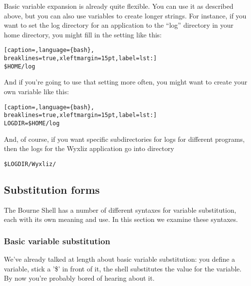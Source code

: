 Basic variable expansion is already quite flexible. You can use it as described
above, but you can also use variables to create longer strings. For instance,
if you want to set the log directory for an application to the ``log''
directory in your home directory, you might fill in the setting like this:
\lstset{basicstyle=\scriptsize, numbers=left, captionpos=b, tabsize=4}
\begin{lstlisting}[caption=,language={bash},
breaklines=true,xleftmargin=15pt,label=lst:]
$HOME/log
\end{lstlisting}

And if you're going to use that setting more often, you might want to create
your own variable like this:
\lstset{basicstyle=\scriptsize, numbers=left, captionpos=b, tabsize=4}
\begin{lstlisting}[caption=,language={bash},
breaklines=true,xleftmargin=15pt,label=lst:]
LOGDIR=$HOME/log
\end{lstlisting}

And, of course, if you want specific subdirectories for logs for different
programs, then the logs for the Wyxliz application go into directory
\begin{verbatim}
$LOGDIR/Wyxliz/
\end{verbatim}

\subsection{Substitution forms}
The Bourne Shell has a number of different syntaxes for variable substitution,
each with its own meaning and use. In this section we examine these syntaxes.

\subsubsection{Basic variable substitution}
We've already talked at length about basic variable substitution: you define a
variable, stick a '\$' in front of it, the shell substitutes the value for the
variable. By now you're probably bored of hearing about it.

